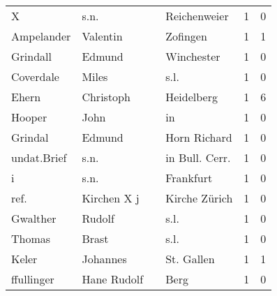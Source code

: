 \begin{tabular}{llllrr}
                        X &                               s.n. &             &                                Reichenweier &          1 &         0 \\
               Ampelander &                           Valentin &             &                                    Zofingen &          1 &         1 \\
                 Grindall &                             Edmund &             &                                  Winchester &          1 &         0 \\
                Coverdale &                              Miles &             &                                        s.l. &          1 &         0 \\
                    Ehern &                          Christoph &             &                                  Heidelberg &          1 &         6 \\
                   Hooper &                               John &             &                                          in &          1 &         0 \\
                  Grindal &                             Edmund &             &                                Horn Richard &          1 &         0 \\
              undat.Brief &                               s.n. &             &                             in Bull. Cerr.  &          1 &         0 \\
                        i &                               s.n. &             &                                   Frankfurt &          1 &         0 \\
                     ref. &                        Kirchen X j &             &                               Kirche Zürich &          1 &         0 \\
                 Gwalther &                             Rudolf &             &                                        s.l. &          1 &         0 \\
                   Thomas &                              Brast &             &                                        s.l. &          1 &         0 \\
                    Keler &                           Johannes &             &                                  St. Gallen &          1 &         1 \\
               ffullinger &                        Hane Rudolf &             &                                        Berg &          1 &         0 \\

\end{tabular}
